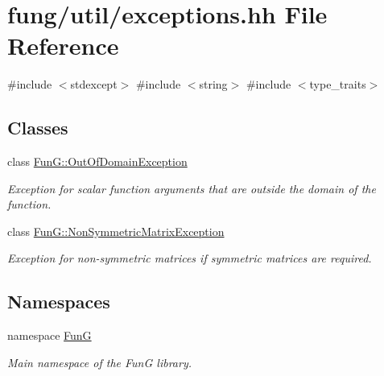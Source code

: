 \hypertarget{exceptions_8hh}{\section{fung/util/exceptions.hh \-File \-Reference}
\label{exceptions_8hh}
}
{\ttfamily \#include $<$stdexcept$>$}\*
{\ttfamily \#include $<$string$>$}\*
{\ttfamily \#include $<$type\-\_\-traits$>$}\*
\subsection*{\-Classes}
\begin{DoxyCompactItemize}
\item 
class \hyperlink{classFunG_1_1OutOfDomainException}{\-Fun\-G\-::\-Out\-Of\-Domain\-Exception}
\begin{DoxyCompactList}\small\item\em \-Exception for scalar function arguments that are outside the domain of the function. \end{DoxyCompactList}\item 
class \hyperlink{classFunG_1_1NonSymmetricMatrixException}{\-Fun\-G\-::\-Non\-Symmetric\-Matrix\-Exception}
\begin{DoxyCompactList}\small\item\em \-Exception for non-\/symmetric matrices if symmetric matrices are required. \end{DoxyCompactList}\end{DoxyCompactItemize}
\subsection*{\-Namespaces}
\begin{DoxyCompactItemize}
\item 
namespace \hyperlink{namespaceFunG}{\-Fun\-G}
\begin{DoxyCompactList}\small\item\em \-Main namespace of the \-Fun\-G library. \end{DoxyCompactList}\end{DoxyCompactItemize}
